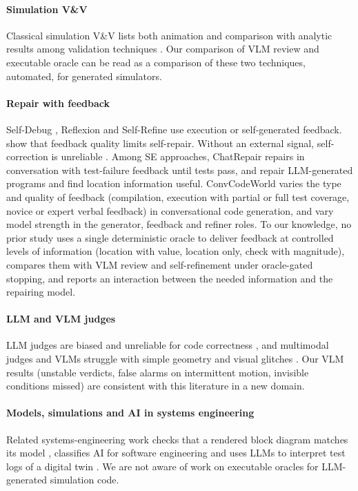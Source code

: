 \paragraph{Simulation V\&V} Classical simulation V\&V lists both animation and comparison with analytic results among validation techniques \citep{sargent2013vv,balci1997vva,kleijnen1995vv}. Our comparison of VLM review and executable oracle can be read as a comparison of these two techniques, automated, for generated simulators.

\paragraph{Repair with feedback} Self-Debug \citep{chen2023selfdebug}, Reflexion \citep{shinn2023reflexion} and Self-Refine \citep{madaan2023selfrefine} use execution or self-generated feedback. \citet{olausson2024selfrepair} show that feedback quality limits self-repair. Without an external signal, self-correction is unreliable \citep{huang2024cannot,kamoi2024selfcorrection}. Among SE approaches, ChatRepair \citep{xia2024chatrepair} repairs in conversation with test-failure feedback until tests pass, and \citet{fan2023repairllm} repair LLM-generated programs and find location information useful. ConvCodeWorld \citep{han2025convcodeworld} varies the type and quality of feedback (compilation, execution with partial or full test coverage, novice or expert verbal feedback) in conversational code generation, and \citet{pan2025gfr} vary model strength in the generator, feedback and refiner roles. To our knowledge, no prior study uses a single deterministic oracle to deliver feedback at controlled levels of information (location with value, location only, check with magnitude), compares them with VLM review and self-refinement under oracle-gated stopping, and reports an interaction between the needed information and the repairing model.

\paragraph{LLM and VLM judges} LLM judges are biased and unreliable for code correctness \citep{zheng2023judging,wang2024notfair,crupi2025llmjudgecode}, and multimodal judges and VLMs struggle with simple geometry and visual glitches \citep{chen2024mllmjudge,rahmanzadehgervi2024blind,taesiri2024glitchbench}. Our VLM results (unstable verdicts, false alarms on intermittent motion, invisible conditions missed) are consistent with this literature in a new domain.

\paragraph{Models, simulations and AI in systems engineering} Related systems-engineering work checks that a rendered block diagram matches its model \citep{waldvogel2026blockdiagram}, classifies AI for software engineering \citep{schieferdecker2026ai4se} and uses LLMs to interpret test logs of a digital twin \citep{hermawan2026log}. We are not aware of work on executable oracles for LLM-generated simulation code.
